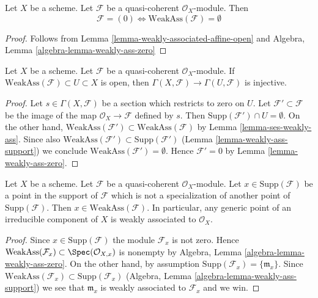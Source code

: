 \begin{lemma}
\label{lemma-weakly-ass-zero}
Let $X$ be a scheme.
Let $\mathcal{F}$ be a quasi-coherent $\mathcal{O}_X$-module.
Then
$$
\mathcal{F} = (0) \Leftrightarrow \text{WeakAss}(\mathcal{F}) = \emptyset
$$
\end{lemma}

\begin{proof}
Follows from
Lemma \ref{lemma-weakly-associated-affine-open}
and
Algebra, Lemma \ref{algebra-lemma-weakly-ass-zero}
\end{proof}

\begin{lemma}
\label{lemma-restriction-injective-open-contains-weakly-ass}
Let $X$ be a scheme. Let $\mathcal{F}$ be a quasi-coherent
$\mathcal{O}_X$-module. If $\text{WeakAss}(\mathcal{F}) \subset U \subset X$
is open, then $\Gamma(X, \mathcal{F}) \to \Gamma(U, \mathcal{F})$
is injective.
\end{lemma}

\begin{proof}
Let $s \in \Gamma(X, \mathcal{F})$ be a section which restricts to zero on $U$.
Let $\mathcal{F}' \subset \mathcal{F}$ be the image of the map
$\mathcal{O}_X \to \mathcal{F}$ defined by $s$. Then
$\text{Supp}(\mathcal{F}') \cap U = \emptyset$. On the other hand,
$\text{WeakAss}(\mathcal{F}') \subset \text{WeakAss}(\mathcal{F})$
by Lemma \ref{lemma-ses-weakly-ass}. Since also
$\text{WeakAss}(\mathcal{F}') \subset \text{Supp}(\mathcal{F}')$
(Lemma \ref{lemma-weakly-ass-support}) we conclude
$\text{WeakAss}(\mathcal{F}') = \emptyset$.
Hence $\mathcal{F}' = 0$ by Lemma \ref{lemma-weakly-ass-zero}.
\end{proof}

\begin{lemma}
\label{lemma-minimal-support-in-weakly-ass}
Let $X$ be a scheme.
Let $\mathcal{F}$ be a quasi-coherent $\mathcal{O}_X$-module.
Let $x \in \text{Supp}(\mathcal{F})$ be a point in the support
of $\mathcal{F}$ which is not a specialization of another point of
$\text{Supp}(\mathcal{F})$. Then
$x \in \text{WeakAss}(\mathcal{F})$.
In particular, any generic point of an irreducible component of $X$
is weakly associated to $\mathcal{O}_X$.
\end{lemma}

\begin{proof}
Since $x \in \text{Supp}(\mathcal{F})$ the module $\mathcal{F}_x$
is not zero. Hence
$\text{WeakAss}(\mathcal{F}_x) \subset \Spec(\mathcal{O}_{X, x})$
is nonempty by
Algebra, Lemma \ref{algebra-lemma-weakly-ass-zero}.
On the other hand, by assumption
$\text{Supp}(\mathcal{F}_x) = \{\mathfrak m_x\}$.
Since
$\text{WeakAss}(\mathcal{F}_x) \subset \text{Supp}(\mathcal{F}_x)$
(Algebra, Lemma \ref{algebra-lemma-weakly-ass-support})
we see that $\mathfrak m_x$ is weakly associated to $\mathcal{F}_x$
and we win.
\end{proof}

